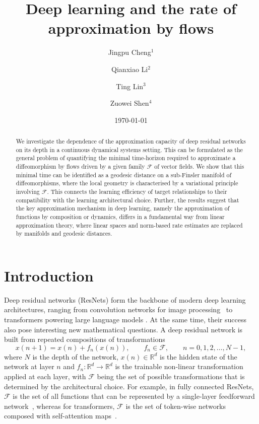 \documentclass[12pt]{amsart}
\title{Deep learning and the rate of approximation by flows}
\author{Jingpu Cheng$^{1}$}
\author{Qianxiao Li$^{2}$}
\author{Ting Lin$^{3}$}
\author{Zuowei Shen$^{4}$}
\date{\today}
\numberwithin{equation}{section}
\theoremstyle{remark}
\newcommand{\ql}[1]{\texttt{\color{cyan} QL: \footnotesize #1}}
\begin{document}
\begin{abstract}
We investigate the dependence of the approximation capacity of
deep residual networks on its depth in a continuous dynamical systems setting.
This can be formulated as the general problem of quantifying the
minimal time-horizon required to approximate a diffeomorphism by flows driven
by a given family $\mathcal F$ of vector fields.
We show that this minimal time can be identified as a geodesic
distance on a sub-Finsler manifold of diffeomorphisms,
where the local geometry is characterised by a
variational principle involving $\mathcal F$.
This connects the learning efficiency of target relationships
to their compatibility with the learning architectural choice.
Further, the results suggest that the key approximation mechanism
in deep learning, namely the approximation of functions
by composition or dynamics, differs in a fundamental
way from linear approximation theory,
where linear spaces and norm-based rate estimates
are replaced by manifolds and geodesic distances.

\end{abstract}

\maketitle

\tableofcontents

\section{Introduction}


Deep residual networks (ResNets) form the backbone of modern deep learning architectures,
ranging from convolution networks for image processing~\cite{he2016deep} to transformers
powering large language models \cite{vaswani2017attention}.
At the same time, their success also pose interesting new mathematical questions.
A deep residual network is built from repeated compositions of transformations
\begin{equation}\label{eq:resnet_discrete}
    x(n+1) = x(n) + f_n(x(n)), \qquad f_n \in \mathcal{F}, \qquad n=0, 1, 2,\dots,N-1,
\end{equation}
where $N$ is the depth of the network,
$x(n) \in \mathbb{R}^d$ is the hidden state of the network at layer $n$
and $f_n : \mathbb{R}^d\to\mathbb{R}^d$ is the trainable non-linear transformation applied at each layer,
with $\mathcal{F}$ being the set of possible transformations that is determined
by the architectural choice.
For example, in fully connected ResNets, $\mathcal F$ is the set of all functions that can be represented by a single-layer feedforward network~\cite{touvron2022resmlp,tolstikhin2021mlp,gorishniy2021revisiting}, whereas for transformers, $\mathcal F$ is the set of token-wise networks composed with self-attention maps~\cite{vaswani2017attention,devlin2019bert,dosovitskiy2020image}.
\end{document}
